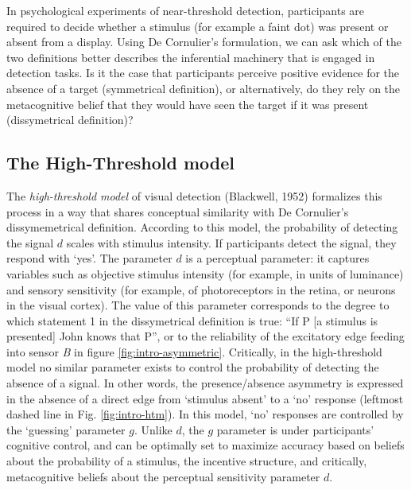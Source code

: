 \documentclass[12pt,twoside]{reedthesis}
\begin{document}
In psychological experiments of near-threshold detection, participants are required to decide whether a stimulus (for example a faint dot) was present or absent from a display. Using De Cornulier's formulation, we can ask which of the two definitions better describes the inferential machinery that is engaged in detection tasks. Is it the case that participants perceive positive evidence for the absence of a target (symmetrical definition), or alternatively, do they rely on the metacognitive belief that they would have seen the target if it was present (dissymetrical definition)?

\hypertarget{htm}{%
\subsection*{The High-Threshold model}\label{htm}}

The \emph{high-threshold model} of visual detection (Blackwell, 1952) formalizes this process in a way that shares conceptual similarity with De Cornulier's dissymemetrical definition. According to this model, the probability of detecting the signal \(d\) scales with stimulus intensity. If participants detect the signal, they respond with `yes'. The parameter \(d\) is a perceptual parameter: it captures variables such as objective stimulus intensity (for example, in units of luminance) and sensory sensitivity (for example, of photoreceptors in the retina, or neurons in the visual cortex). The value of this parameter corresponds to the degree to which statement 1 in the dissymetrical definition is true: ``If P {[}a stimulus is presented{]} John knows that P'', or to the reliability of the excitatory edge feeding into sensor \emph{B} in figure \ref{fig:intro-asymmetric}. Critically, in the high-threshold model no similar parameter exists to control the probability of detecting the absence of a signal. In other words, the presence/absence asymmetry is expressed in the absence of a direct edge from `stimulus absent' to a `no' response (leftmost dashed line in Fig. \ref{fig:intro-htm}). In this model, `no' responses are controlled by the `guessing' parameter \(g\). Unlike \(d\), the \(g\) parameter is under participants' cognitive control, and can be optimally set to maximize accuracy based on beliefs about the probability of a stimulus, the incentive structure, and critically, metacognitive beliefs about the perceptual sensitivity parameter \(d\).
\end{document}
